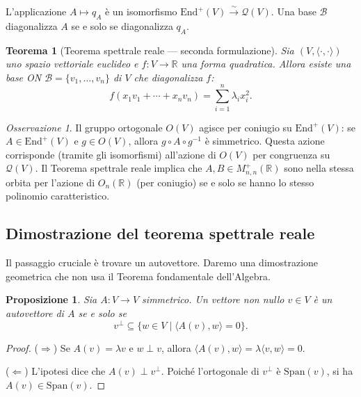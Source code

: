 \documentclass[11pt, a4paper]{book}
\theoremstyle{definition}
\theoremstyle{plain}
\newtheorem{teorema}[definizione]{Teorema}
\newtheorem{proposizione}[definizione]{Proposizione}
\theoremstyle{remark}
\newtheorem{osservazione}[definizione]{Osservazione}
\newcommand{\R}{\mathbb{R}}
\begin{document}
L'applicazione $A \mapsto q_A$ è un isomorfismo $\mathrm{End}^+(V) \xrightarrow{\sim} \mathcal{Q}(V)$. Una base $\mathcal{B}$ diagonalizza $A$ se e solo se diagonalizza $q_A$.

\begin{teorema}[Teorema spettrale reale --- seconda formulazione]
\label{thm:spettrale-reale-II}
Sia $(V,\langle\cdot,\cdot\rangle)$ uno spazio vettoriale euclideo e $f \colon V \to \R$ una forma quadratica. Allora esiste una base ON $\mathcal{B} = \{v_1,\ldots,v_n\}$ di $V$ che diagonalizza $f$:
\[
  f(x_1v_1+\cdots+x_nv_n) = \sum_{i=1}^n \lambda_i x_i^2.
\]
\end{teorema}

\begin{osservazione}
Il gruppo ortogonale $O(V)$ agisce per coniugio su $\mathrm{End}^+(V)$: se $A \in \mathrm{End}^+(V)$ e $g \in O(V)$, allora $g \circ A \circ g^{-1}$ è simmetrico. Questa azione corrisponde (tramite gli isomorfismi) all'azione di $O(V)$ per congruenza su $\mathcal{Q}(V)$. Il Teorema spettrale reale implica che $A, B \in M^+_{n,n}(\R)$ sono nella stessa orbita per l'azione di $O_n(\R)$ (per coniugio) se e solo se hanno lo stesso polinomio caratteristico.
\end{osservazione}

\subsection{Dimostrazione del teorema spettrale reale}
\label{ssec:dim-spettrale}

Il passaggio cruciale è trovare un autovettore. Daremo una dimostrazione geometrica che non usa il Teorema fondamentale dell'Algebra.

\begin{proposizione}
\label{prop:autovett-crit}
Sia $A \colon V \to V$ simmetrico. Un vettore non nullo $v \in V$ è un autovettore di $A$ se e solo se
\[
  v^\perp \subseteq \{ w \in V \mid \langle A(v), w\rangle = 0 \}.
\]
\end{proposizione}

\begin{proof}
($\Rightarrow$) Se $A(v) = \lambda v$ e $w \perp v$, allora $\langle A(v),w\rangle = \lambda\langle v,w\rangle = 0$.

($\Leftarrow$) L'ipotesi dice che $A(v) \perp v^\perp$. Poiché l'ortogonale di $v^\perp$ è $\mathrm{Span}(v)$, si ha $A(v) \in \mathrm{Span}(v)$.
\end{proof}
\end{document}
